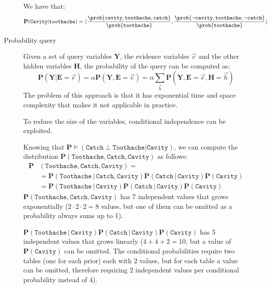 \begin{description}
\begin{example}
            We have that:
            \[
                \textbf{P}(\texttt{Cavity} \vert \texttt{toothache}) = 
                    \langle 
                        \frac{\prob{\texttt{cavity}, \texttt{toothache}, \texttt{catch}}}{\prob{\texttt{toothache}}},
                        \frac{\prob{\lnot\texttt{cavity}, \texttt{toothache}, \lnot\texttt{catch}}}{\prob{\texttt{toothache}}}
                    \rangle  
            \]
        \end{example}

    \item[Probability query] 
        Given a set of query variables $\bm{Y}$, the evidence variables $\vec{e}$ and the other hidden variables $\bm{H}$,
        the probability of the query can be computed as:
        \[ 
            \textbf{P}(\bm{Y} \vert \bm{E}=\vec{e}) = \alpha \textbf{P}(\bm{Y}, \bm{E}=\vec{e})
                = \alpha \sum_{\vec{h}} \textbf{P}(\bm{Y}, \bm{E}=\vec{e}, \bm{H}=\vec{h})
        \]
        The problem of this approach is that it has exponential time and space complexity
        that makes it not applicable in practice.

        To reduce the size of the variables, conditional independence can be exploited.
        \begin{example}
            Knowing that $\textbf{P} \models (\texttt{Catch} \perp \texttt{Toothache} \vert \texttt{Cavity})$,
            we can compute the distribution $\textbf{P}(\texttt{Toothache}, \texttt{Catch}, \texttt{Cavity})$ as follows:
            \[
                \begin{split}
                    \textbf{P}&(\texttt{Toothache}, \texttt{Catch}, \texttt{Cavity}) = \\
                        &= \textbf{P}(\texttt{Toothache} \,\vert\, \texttt{Catch}, \texttt{Cavity})
                            \textbf{P}(\texttt{Catch} \,\vert\, \texttt{Cavity}) \textbf{P}(\texttt{Cavity}) \\
                        &= \textbf{P}(\texttt{Toothache} \,\vert\, \texttt{Cavity})
                            \textbf{P}(\texttt{Catch} \,\vert\, \texttt{Cavity}) \textbf{P}(\texttt{Cavity})
                \end{split}
            \]
            $\textbf{P}(\texttt{Toothache}, \texttt{Catch}, \texttt{Cavity})$ has 7 independent values that grows exponentially
            ($2 \cdot 2 \cdot 2 = 8$ values, but one of them can be omitted as a probability always sums up to 1).

            $\textbf{P}(\texttt{Toothache} \,\vert\, \texttt{Cavity}) \textbf{P}(\texttt{Catch} \,\vert\, \texttt{Cavity}) \textbf{P}(\texttt{Cavity})$
            has 5 independent values that grows linearly ($4 + 4 + 2 = 10$, but a value of $\textbf{P}(\texttt{Cavity})$ can be omitted.
            The conditional probabilities require two tables (one for each prior) each with 2 values, 
            but for each table a value can be omitted, therefore requiring $2$ independent values per conditional probability instead of $4$).
        \end{example}
\end{description}



